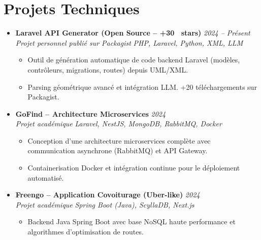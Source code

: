 \documentclass[a4paper,11pt]{article}
\begin{document}
\section{Projets Techniques}
\begin{itemize}[leftmargin=*, label={-}]

\item \textbf{Laravel API Generator (Open Source -- +30 \faGithub\ stars)} \hfill \textit{2024 -- Présent} \\
\textit{Projet personnel publié sur Packagist} \hfill \textit{PHP, Laravel, Python, XML, LLM}
\vspace{-2pt}
    \begin{itemize}[leftmargin=0.4cm, nosep, label=\tiny$\bullet$]
        \item \small{Outil de génération automatique de code backend Laravel (modèles, contrôleurs, migrations, routes) depuis UML/XML.}
        \item \small{Parsing géométrique avancé et intégration LLM. +20 téléchargements sur Packagist.}
    \end{itemize}
\vspace{3pt}

\item \textbf{GoFind -- Architecture Microservices} \hfill \textit{2024} \\
\textit{Projet académique} \hfill \textit{Laravel, NestJS, MongoDB, RabbitMQ, Docker}
\vspace{-2pt}
    \begin{itemize}[leftmargin=0.4cm, nosep, label=\tiny$\bullet$]
        \item \small{Conception d'une architecture microservices complète avec communication asynchrone (RabbitMQ) et API Gateway.}
        \item \small{Containerisation Docker et intégration continue pour le déploiement automatisé.}
    \end{itemize}
\vspace{3pt}

\item \textbf{Freengo -- Application Covoiturage (Uber-like)} \hfill \textit{2024} \\
\textit{Projet académique} \hfill \textit{Spring Boot (Java), ScyllaDB, Next.js}
\vspace{-2pt}
    \begin{itemize}[leftmargin=0.4cm, nosep, label=\tiny$\bullet$]
        \item \small{Backend Java Spring Boot avec base NoSQL haute performance et algorithmes d'optimisation de routes.}
    \end{itemize}
\vspace{3pt}

\end{itemize}
\end{document}
